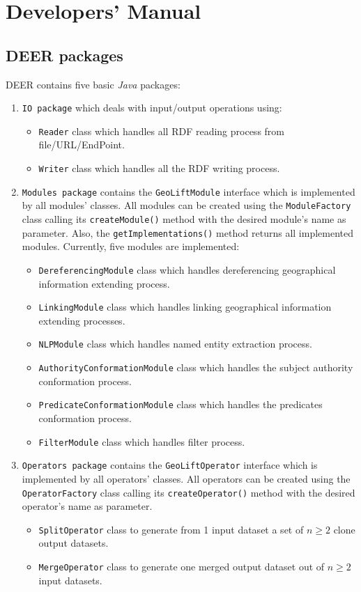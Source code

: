\documentclass[a4paper,twoside,bibtotoc,abstracton,12pt,BCOR=15mm]{article}
\newcommand{\geolift}{\textsc{DEER}\xspace}
\begin{document}
\section{Developers' Manual}

\subsection{\geolift packages}
\geolift contains five basic \emph{Java} packages: 
\begin{enumerate}
 \item \texttt{IO package} which deals with input/output operations using:
   \begin{itemize}
    \item \texttt{Reader} class which handles all RDF reading process from file/URL/EndPoint. 
    \item \texttt{Writer} class which handles all the RDF writing process. 
  \end{itemize}

  \item\texttt{Modules package} contains the \texttt{GeoLiftModule} interface which is implemented by all modules' classes.
      All modules can be created using the \texttt{ModuleFactory} class calling its \texttt{createModule()} method with the desired module's name as parameter.
      Also, the \texttt{getImplementations()} method returns all implemented modules.
      Currently, five modules are implemented:
      \begin{itemize}
	\item \texttt{DereferencingModule} class which handles dereferencing  geographical information extending process. 
	\item \texttt{LinkingModule} class which handles linking geographical information extending processes. 
	\item \texttt{NLPModule} class which handles named entity extraction process.
	\item \texttt{AuthorityConformationModule} class which handles the subject authority conformation process.
	\item \texttt{PredicateConformationModule} class which handles the predicates conformation process.
	\item \texttt{FilterModule} class which handles filter process.
      \end{itemize}
  
   \item \texttt{Operators package} contains the \texttt{GeoLiftOperator} interface which is implemented by all operators' classes.
    All operators can be created using the \texttt{OperatorFactory} class calling its \texttt{createOperator()} method with the desired operator's name as parameter.
      \begin{itemize}
	\item \texttt{SplitOperator} class to generate from 1 input dataset a set of $n \geq 2$ clone output datasets.
	\item \texttt{MergeOperator} class to generate one merged output dataset out of $n \geq 2$ input datasets.
      \end{itemize}
 

\end{enumerate}
\end{document}

